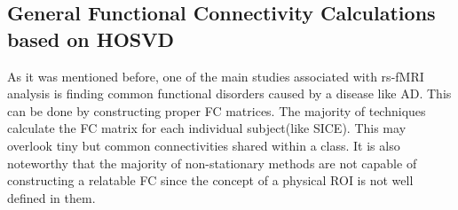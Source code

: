 \documentclass[preprint,12pt]{elsarticle}
\begin{document}
	\subsection{General Functional Connectivity Calculations based on HOSVD} \label{FC_Construction}
	
	
	As it was mentioned before, one of the main studies associated with rs-fMRI analysis is finding common functional disorders caused by a disease like AD. This can be done by constructing proper FC matrices. The majority of techniques calculate the FC matrix for each individual subject(like SICE). This may overlook tiny but common connectivities shared within a class. It is also noteworthy that the majority of non-stationary methods are not capable of constructing a relatable FC since the concept of a physical ROI is not well defined in them.  
	
	
	
\end{document}

